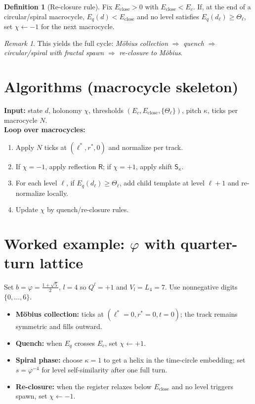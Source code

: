 \documentclass[11pt]{article}
\theoremstyle{definition}
\newtheorem{definition}[theorem]{Definition}
\theoremstyle{remark}
\newtheorem{remark}[theorem]{Remark}
\begin{document}
\begin{definition}[Re-closure rule]
Fix $E_{\mathrm{close}}>0$ with $E_{\mathrm{close}}<E_c$. If, at the end of a circular/spiral macrocycle, $E_q(d)<E_{\mathrm{close}}$ and no level satisfies $E_q(d_\ell)\ge\Theta_\ell$, set $\chi\leftarrow -1$ for the next macrocycle.
\end{definition}

\begin{remark}
This yields the full cycle: \emph{M\"obius collection} $\Rightarrow$ \emph{quench} $\Rightarrow$ \emph{circular/spiral with fractal spawn} $\Rightarrow$ \emph{re-closure to M\"obius}.
\end{remark}

\section{Algorithms (macrocycle skeleton)}\label{sec:algo}
\noindent\textbf{Input:} state $d$, holonomy $\chi$, thresholds $(E_c,E_{\mathrm{close}},\{\Theta_\ell\})$, pitch $\kappa$, ticks per macrocycle $N$.\\
\textbf{Loop over macrocycles:}
\begin{enumerate}
\item Apply $N$ ticks at $(\ell^{*},r^{*},0)$ and normalize per track.
\item If $\chi=-1$, apply reflection $\mathsf R$; if $\chi=+1$, apply shift $\mathsf S_\kappa$.
\item For each level $\ell$, if $E_q(d_\ell)\ge \Theta_\ell$, add child template at level $\ell+1$ and re-normalize locally.
\item Update $\chi$ by quench/re-closure rules.
\end{enumerate}

\section{Worked example: $\varphi$ with quarter-turn lattice}\label{sec:example}
Set $b=\varphi=\tfrac{1+\sqrt5}{2}$, $l=4$ so $Q^l=+1$ and $V_l=L_4=7$. Use nonnegative digits $\{0,\dots,6\}$.
\begin{itemize}
\item \textbf{M\"obius collection:} ticks at $(\ell^{*}=0,r^{*}=0,t=0)$; the track remains symmetric and fills outward.
\item \textbf{Quench:} when $E_q$ crosses $E_c$, set $\chi\leftarrow +1$.
\item \textbf{Spiral phase:} choose $\kappa=1$ to get a helix in the time-circle embedding; set $s=\varphi^{-4}$ for level self-similarity after one full turn.
\item \textbf{Re-closure:} when the register relaxes below $E_{\mathrm{close}}$ and no level triggers spawn, set $\chi\leftarrow -1$.
\end{itemize}
\end{document}
